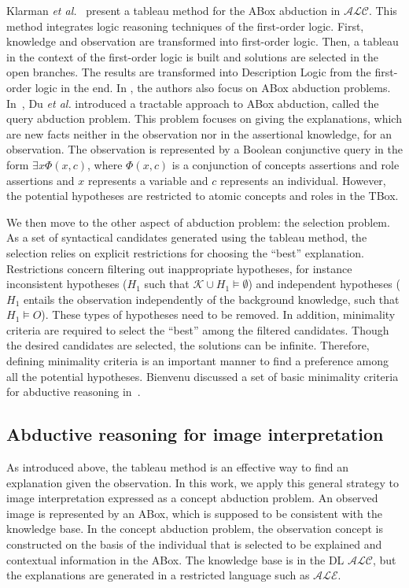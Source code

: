 \documentclass{article}
\begin{document}
Klarman \textit{et al.}~\cite{klarman2011abox} present a tableau method for the ABox abduction in $\mathcal{ALC}$.
This method integrates logic reasoning techniques of the first-order logic. First, knowledge and observation are
transformed into first-order logic. Then, a tableau in the context of the first-order logic is built and solutions
are selected in the open branches. The results are transformed into Description Logic from the first-order logic in the end.
In \cite{du2011towards,du2014tractable}, the authors also focus on ABox abduction problems. 
In~\cite{du2014tractable}, Du \textit{et al.} introduced a tractable approach to ABox abduction, called the query abduction problem.
This problem focuses on giving the explanations, which are new facts neither in the observation nor in the assertional knowledge, for an observation.
The observation is represented by a Boolean conjunctive query in the form $\exists x\Phi(x,c)$, where $\Phi(x,c)$ is a conjunction of concepts
assertions and role assertions and $x$ represents a variable and $c$ represents an individual.
However, the potential hypotheses are restricted to atomic concepts and roles in the TBox.

We then move to the other aspect of abduction problem: the selection problem.
As a set of syntactical candidates generated using the tableau method, the selection relies on explicit restrictions for choosing the ``best'' explanation.
Restrictions concern filtering out inappropriate hypotheses,
for instance inconsistent hypotheses ($H_1$ such that $\mathcal{K}\cup H_1\vDash \emptyset$) and independent hypotheses ($H_1$ entails the observation independently of the background knowledge,
such that $H_1\vDash O$).
These types of hypotheses need to be removed.
In addition, minimality criteria are required to select the ``best'' among the filtered candidates.
Though the desired candidates are selected, the solutions can be infinite.
Therefore, defining minimality criteria is an important manner to find a preference among all the potential hypotheses.
Bienvenu  discussed a set of basic minimality criteria for abductive reasoning in~\cite{bienvenu08complexity}.


\subsection{Abductive reasoning for image interpretation}
As introduced above, the tableau method is an effective way to find an explanation given the observation.
In this work, we apply this general strategy to image interpretation expressed as a concept abduction problem.
An observed image is represented by an ABox, which is supposed to be consistent with the knowledge base. 
In the concept abduction problem, the observation concept is constructed on the basis of the individual that is selected to be explained and
contextual information in the ABox.
The knowledge base is in the DL $\mathcal{ALC}$, but the explanations are generated in a restricted language such as $\mathcal{ALE}$.
\end{document}
